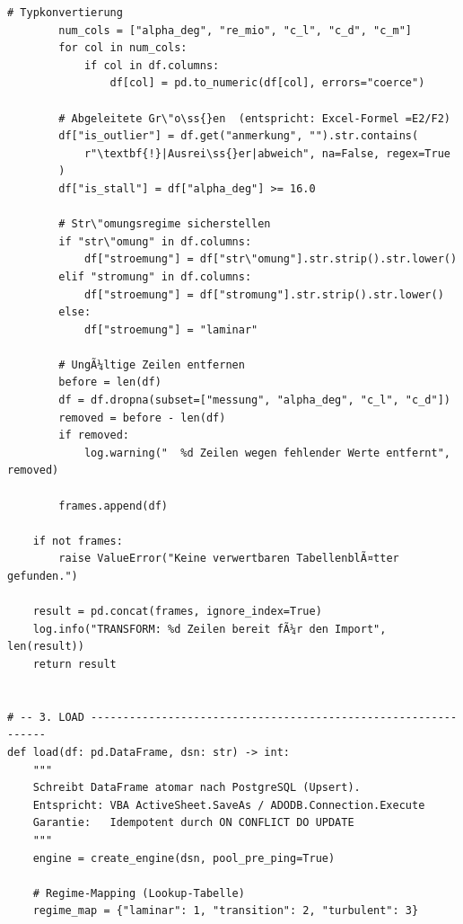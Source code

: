 ﻿\documentclass[12pt,a4paper]{report}
\theoremstyle{definition}
\theoremstyle{remark}
\begin{document}
\begin{lstlisting}[style=python, caption={migrate.py: VollstÃ¤ndige ETL-Pipeline}, label=lst:etl]
        # Typkonvertierung
        num_cols = ["alpha_deg", "re_mio", "c_l", "c_d", "c_m"]
        for col in num_cols:
            if col in df.columns:
                df[col] = pd.to_numeric(df[col], errors="coerce")

        # Abgeleitete Gr\"o\ss{}en  (entspricht: Excel-Formel =E2/F2)
        df["is_outlier"] = df.get("anmerkung", "").str.contains(
            r"\textbf{!}|Ausrei\ss{}er|abweich", na=False, regex=True
        )
        df["is_stall"] = df["alpha_deg"] >= 16.0

        # Str\"omungsregime sicherstellen
        if "str\"omung" in df.columns:
            df["stroemung"] = df["str\"omung"].str.strip().str.lower()
        elif "stromung" in df.columns:
            df["stroemung"] = df["stromung"].str.strip().str.lower()
        else:
            df["stroemung"] = "laminar"

        # UngÃ¼ltige Zeilen entfernen
        before = len(df)
        df = df.dropna(subset=["messung", "alpha_deg", "c_l", "c_d"])
        removed = before - len(df)
        if removed:
            log.warning("  %d Zeilen wegen fehlender Werte entfernt", removed)

        frames.append(df)

    if not frames:
        raise ValueError("Keine verwertbaren TabellenblÃ¤tter gefunden.")

    result = pd.concat(frames, ignore_index=True)
    log.info("TRANSFORM: %d Zeilen bereit fÃ¼r den Import", len(result))
    return result


# -- 3. LOAD ---------------------------------------------------------------
def load(df: pd.DataFrame, dsn: str) -> int:
    """
    Schreibt DataFrame atomar nach PostgreSQL (Upsert).
    Entspricht: VBA ActiveSheet.SaveAs / ADODB.Connection.Execute
    Garantie:   Idempotent durch ON CONFLICT DO UPDATE
    """
    engine = create_engine(dsn, pool_pre_ping=True)

    # Regime-Mapping (Lookup-Tabelle)
    regime_map = {"laminar": 1, "transition": 2, "turbulent": 3}


\end{lstlisting}
\end{document}
